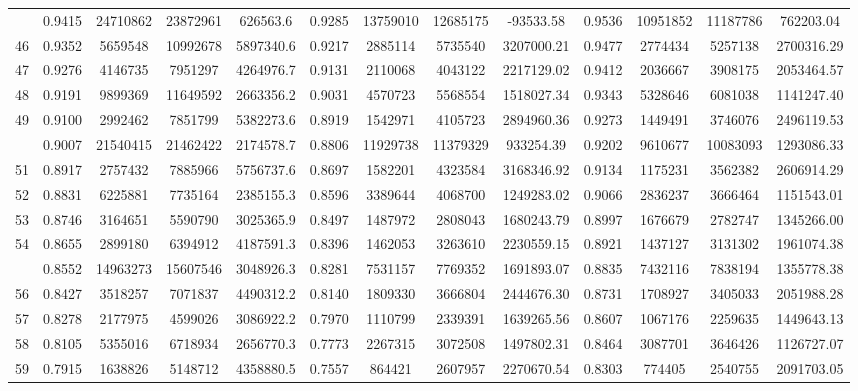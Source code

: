 \documentclass[
  12pt,
]{article}
\begin{document}
\begin{longtable}[t]{lcccccccccccc}
\addlinespace
45 & 0.9415 & 24710862 & 23872961 & 626563.6 & 0.9285 & 13759010 & 12685175 & -93533.58 & 0.9536 & 10951852 & 11187786 & 762203.04\\
46 & 0.9352 & 5659548 & 10992678 & 5897340.6 & 0.9217 & 2885114 & 5735540 & 3207000.21 & 0.9477 & 2774434 & 5257138 & 2700316.29\\
47 & 0.9276 & 4146735 & 7951297 & 4264976.7 & 0.9131 & 2110068 & 4043122 & 2217129.02 & 0.9412 & 2036667 & 3908175 & 2053464.57\\
48 & 0.9191 & 9899369 & 11649592 & 2663356.2 & 0.9031 & 4570723 & 5568554 & 1518027.34 & 0.9343 & 5328646 & 6081038 & 1141247.40\\
49 & 0.9100 & 2992462 & 7851799 & 5382273.6 & 0.8919 & 1542971 & 4105723 & 2894960.36 & 0.9273 & 1449491 & 3746076 & 2496119.53\\
\addlinespace
50 & 0.9007 & 21540415 & 21462422 & 2174578.7 & 0.8806 & 11929738 & 11379329 & 933254.39 & 0.9202 & 9610677 & 10083093 & 1293086.33\\
51 & 0.8917 & 2757432 & 7885966 & 5756737.6 & 0.8697 & 1582201 & 4323584 & 3168346.92 & 0.9134 & 1175231 & 3562382 & 2606914.29\\
52 & 0.8831 & 6225881 & 7735164 & 2385155.3 & 0.8596 & 3389644 & 4068700 & 1249283.02 & 0.9066 & 2836237 & 3666464 & 1151543.01\\
53 & 0.8746 & 3164651 & 5590790 & 3025365.9 & 0.8497 & 1487972 & 2808043 & 1680243.79 & 0.8997 & 1676679 & 2782747 & 1345266.00\\
54 & 0.8655 & 2899180 & 6394912 & 4187591.3 & 0.8396 & 1462053 & 3263610 & 2230559.15 & 0.8921 & 1437127 & 3131302 & 1961074.38\\
\addlinespace
55 & 0.8552 & 14963273 & 15607546 & 3048926.3 & 0.8281 & 7531157 & 7769352 & 1691893.07 & 0.8835 & 7432116 & 7838194 & 1355778.38\\
56 & 0.8427 & 3518257 & 7071837 & 4490312.2 & 0.8140 & 1809330 & 3666804 & 2444676.30 & 0.8731 & 1708927 & 3405033 & 2051988.28\\
57 & 0.8278 & 2177975 & 4599026 & 3086922.2 & 0.7970 & 1110799 & 2339391 & 1639265.56 & 0.8607 & 1067176 & 2259635 & 1449643.13\\
58 & 0.8105 & 5355016 & 6718934 & 2656770.3 & 0.7773 & 2267315 & 3072508 & 1497802.31 & 0.8464 & 3087701 & 3646426 & 1126727.07\\
59 & 0.7915 & 1638826 & 5148712 & 4358880.5 & 0.7557 & 864421 & 2607957 & 2270670.54 & 0.8303 & 774405 & 2540755 & 2091703.05\\

\end{longtable}
\end{document}
